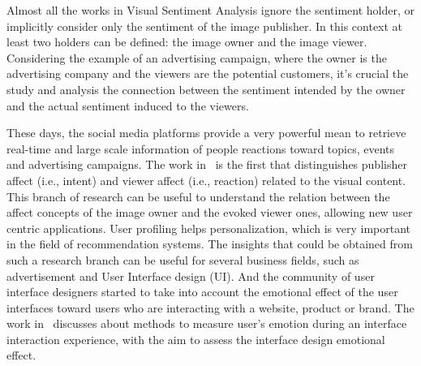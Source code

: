 Almost all the works in Visual Sentiment Analysis ignore the sentiment holder, or implicitly consider only the sentiment of the image publisher. In this context at least two holders can be defined: the image owner and the image viewer. Considering the example of an advertising campaign, where the owner is the advertising company and the viewers are the potential customers, it's crucial the study and analysis the connection between the sentiment intended by the owner and the actual sentiment induced to the viewers. 

These days, the social media platforms provide a very powerful mean to retrieve real-time and large scale information of people reactions toward topics, events and advertising campaigns.  
The work in~\cite{chen2014predicting} is the first that distinguishes publisher affect (i.e., intent) and viewer affect (i.e., reaction) related to the visual content. 
This branch of research can be useful to understand the relation between the affect concepts of the image owner and the evoked viewer ones, allowing new user centric applications.
User profiling helps personalization, which is very important in the field of recommendation systems. The insights that could be obtained from such a research branch can be useful for several business fields, such as advertisement and User Interface design (UI). And the community of user interface designers started to take into account the emotional effect of the user interfaces toward users who are interacting with a website, product or brand. The work in~\cite{lockner2014emotion} discusses about methods to measure user’s emotion during an interface interaction experience, with the aim to assess the interface design emotional effect. 
